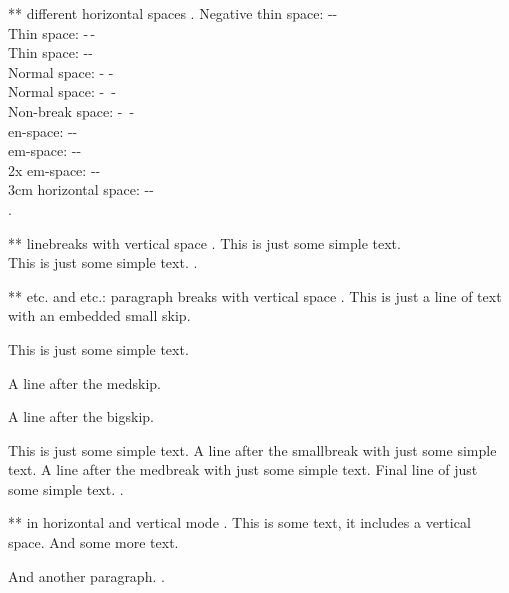 ** different horizontal spaces
.
Negative thin space: -\negthinspace- \\
Thin space: -\,- \\
Thin space: -\thinspace- \\
Normal space: - - \\
Normal space: -\ - \\
Non-break space: -~- \\
en-space: -\enspace- \\
em-space: -\quad- \\
2x em-space: -\qquad-\\
3cm horizontal space: -\hspace{3cm}- \\
.


** linebreaks with vertical space
.
This is just some simple text.\\[1cm]
This is just some simple text.
.


** \smallskip etc. and \smallbreak etc.: paragraph breaks with vertical space
.
This is just a line of text \smallskip with an embedded small skip.

This is just some simple text.

\medskip
A line after the medskip.

\bigskip

A line after the bigskip.

This is just some simple text.
\smallbreak
A line after the smallbreak with just some simple text.
\medbreak
A line after the medbreak with just some simple text.
\bigbreak
Final line of just some simple text.
.


** \vspace{} in horizontal and vertical mode
.
This is some text, it includes\vspace{1cm} a vertical space. And some more text.

\vspace{1cm}
And another paragraph.
.
